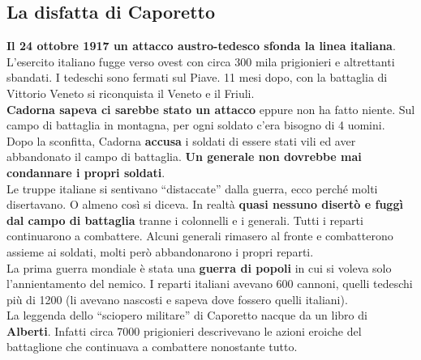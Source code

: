 \subsection{La disfatta di Caporetto}
\textbf{Il 24 ottobre 1917 un attacco austro-tedesco sfonda la linea italiana}. L'esercito italiano
fugge verso ovest con circa 300 mila prigionieri e altrettanti sbandati. I tedeschi sono fermati sul
Piave. 11 mesi dopo, con la battaglia di Vittorio Veneto si riconquista il Veneto e il Friuli.\\
\textbf{Cadorna sapeva ci sarebbe stato un attacco} eppure non ha fatto niente. Sul campo di 
battaglia in montagna, per ogni soldato c'era bisogno di 4 uomini. Dopo la sconfitta, Cadorna
\textbf{accusa} i soldati di essere stati vili ed aver abbandonato il campo di battaglia. \textbf{Un
generale non dovrebbe mai condannare i propri soldati}.\\
Le truppe italiane si sentivano ``distaccate'' dalla guerra, ecco perché molti disertavano. O almeno
così si diceva. In realtà \textbf{quasi nessuno disertò e fuggì dal campo di battaglia} tranne i
colonnelli e i generali. Tutti i reparti continuarono a combattere. Alcuni generali rimasero
al fronte e combatterono assieme ai soldati, molti però abbandonarono i propri reparti.\\
La prima guerra mondiale è stata una \textbf{guerra di popoli} in cui si voleva solo l'annientamento
del nemico. I reparti italiani avevano 600 cannoni, quelli tedeschi più di 1200 (li avevano nascosti
e sapeva dove fossero quelli italiani).\\
La leggenda dello ``sciopero militare'' di Caporetto nacque da un libro di \textbf{Alberti}. Infatti
circa 7000 prigionieri descrivevano le azioni eroiche del battaglione che continuava a combattere
nonostante tutto.

